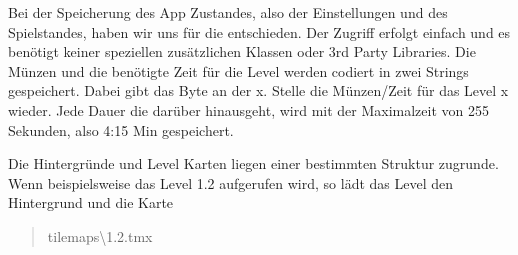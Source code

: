 \label{sec:3_Speichersystem}

Bei der Speicherung des App Zustandes, also der Einstellungen und des Spielstandes, haben wir uns für die  entschieden. Der Zugriff erfolgt einfach und es benötigt keiner speziellen zusätzlichen Klassen oder 3rd Party Libraries. Die Münzen und die benötigte Zeit für die Level werden codiert in zwei Strings gespeichert. Dabei gibt das Byte an der x. Stelle die Münzen/Zeit für das Level x wieder. Jede Dauer die darüber hinausgeht, wird mit der Maximalzeit von 255 Sekunden, also 4:15 Min gespeichert.

Die Hintergründe und Level Karten liegen einer bestimmten Struktur zugrunde. Wenn beispielsweise das Level 1.2 aufgerufen wird, so lädt das Level den Hintergrund  und die Karte \blockquote{tilemaps\textbackslash 1.2.tmx}.
